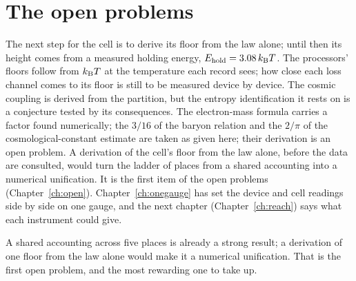\section{The open problems}\label{sec:synth:notshown}
The next step for the cell is to derive its floor from the law alone; until then its height comes from a measured holding energy, $E_{\rm hold}=3.08\,k_{\mathrm B} T$. The processors' floors
follow from $k_{\mathrm B} T$ at the temperature each record sees; how close each loss channel comes to its floor is still to be measured device by
device. The cosmic coupling is derived from the partition, but the entropy identification it rests on is a
conjecture tested by its consequences. The electron-mass formula carries a factor found numerically; the $3/16$ of the baryon relation and the
$2/\pi$ of the cosmological-constant estimate are taken as given here; their derivation is an open problem. A derivation of the cell's floor from the law alone, before the data are consulted, would
turn the ladder of places from a shared accounting into a numerical unification. It is the first item of the open problems
(Chapter~\ref{ch:open}). Chapter~\ref{ch:onegauge} has set the device and cell readings side by side on one gauge, and the next chapter
(Chapter~\ref{ch:reach}) says what each instrument could give.

A shared accounting across five places is already a strong result; a derivation of one floor from the law alone would make it a numerical unification. That is the first open problem, and the most rewarding one to take up.

